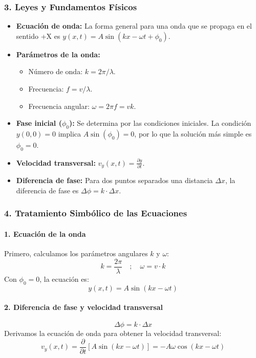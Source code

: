 \subsubsection*{3. Leyes y Fundamentos Físicos}
\begin{itemize}
    \item \textbf{Ecuación de onda:} La forma general para una onda que se propaga en el sentido +X es $y(x,t) = A\sin(kx - \omega t + \phi_0)$.
    \item \textbf{Parámetros de la onda:}
        \begin{itemize}
            \item Número de onda: $k = 2\pi/\lambda$.
            \item Frecuencia: $f = v/\lambda$.
            \item Frecuencia angular: $\omega = 2\pi f = vk$.
        \end{itemize}
    \item \textbf{Fase inicial ($\phi_0$):} Se determina por las condiciones iniciales. La condición $y(0,0)=0$ implica $A\sin(\phi_0)=0$, por lo que la solución más simple es $\phi_0=0$.
    \item \textbf{Velocidad transversal:} $v_y(x,t) = \frac{\partial y}{\partial t}$.
    \item \textbf{Diferencia de fase:} Para dos puntos separados una distancia $\Delta x$, la diferencia de fase es $\Delta\phi = k \cdot \Delta x$.
\end{itemize}

\subsubsection*{4. Tratamiento Simbólico de las Ecuaciones}
\paragraph{1. Ecuación de la onda}
Primero, calculamos los parámetros angulares $k$ y $\omega$:
$$k = \frac{2\pi}{\lambda} \quad ; \quad \omega = v \cdot k$$
Con $\phi_0=0$, la ecuación es:
$$y(x,t) = A\sin(kx - \omega t)$$
\paragraph{2. Diferencia de fase y velocidad transversal}
$$\Delta\phi = k \cdot \Delta x$$
Derivamos la ecuación de onda para obtener la velocidad transversal:
$$v_y(x,t) = \frac{\partial}{\partial t} [A\sin(kx - \omega t)] = -A\omega\cos(kx - \omega t)$$

